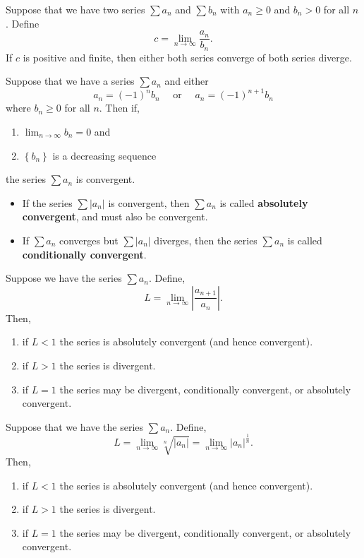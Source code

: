 \begin{thm}
Suppose that we have two series $\sum a_n$ and $\sum b_n$ with $a_n\geq 0$ and $b_n > 0$ for all $n$. Define
$$c=\lim_{n\to\infty}\frac{a_n}{b_n}.$$
If $c$ is positive and finite, then either both series converge of both series diverge.
\end{thm}



\begin{thm}
Suppose that we have a series $\sum a_{n}$ and either $$a_{n}=(-1)^{n} b_{n}\quad\text{ or }\quad  a_{n}=(-1)^{n+1} b_{n}$$ where $b_{n} \geq 0$ for all $n .$ Then if,
\begin{enumerate}
    \item $\displaystyle\lim _{n \to \infty} b_{n}=0$ and
    \item $\left\{b_{n}\right\}$ is a decreasing sequence
\end{enumerate}
the series $\sum a_{n}$ is convergent.
\end{thm}


\begin{thm}
\phantom{}
\begin{itemize}[leftmargin=1em]
    \item If the series $\sum |a_n|$ is convergent, then $\sum a_n$ is called \textbf{absolutely convergent}, and must also be convergent.
    \item If $\sum a_n$ converges but $\sum |a_n|$ diverges, then the series $\sum a_n$ is called \textbf{conditionally convergent}.
\end{itemize}
\end{thm}


\begin{thm}
Suppose we have the series $\sum a_{n}$. Define,
$$L=\lim _{n \to \infty} \left|\frac{a_{n+1}}{a_{n}}\right|.$$
Then,
\begin{enumerate}[leftmargin=1em]
    \item if $L<1$ the series is absolutely convergent (and hence convergent).
    \item if $L>1$ the series is divergent.
    \item  if $L=1$ the series may be divergent, conditionally convergent, or absolutely convergent.
\end{enumerate}
\end{thm}

\begin{thm}
Suppose that we have the series $\sum a_{n}$. Define,
$$L=\lim _{n \to \infty} \sqrt[n]{\left|a_{n}\right|}=\lim _{n \rightarrow \infty}\left|a_{n}\right|^{\frac{1}{n}}.$$
Then,
\begin{enumerate}[leftmargin=1em]
    \item if $L<1$ the series is absolutely convergent (and hence convergent).
    \item if $L>1$ the series is divergent.
    \item if $L=1$ the series may be divergent, conditionally convergent, or absolutely convergent.
\end{enumerate}
\end{thm}
